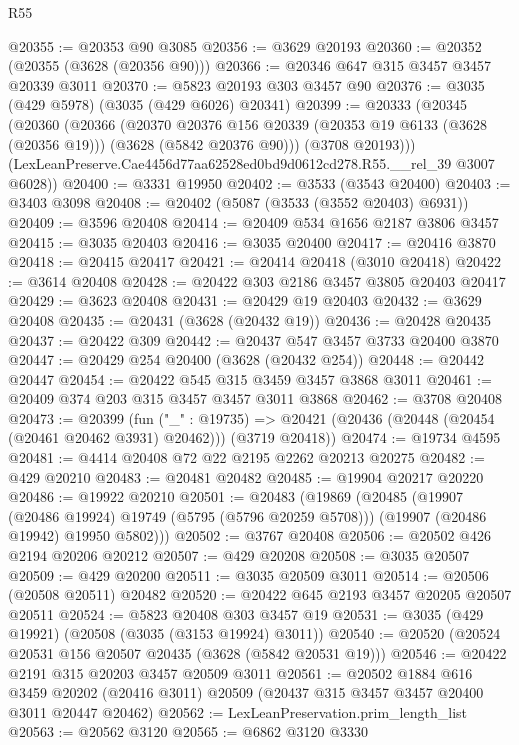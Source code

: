 \begin{lexlean}{R55}
\begin{coremodule}
@20355 := @20353 @90 @3085
@20356 := @3629 @20193
@20360 := @20352 (@20355 (@3628 (@20356 @90)))
@20366 := @20346 @647 @315 @3457 @3457 @20339 @3011
@20370 := @5823 @20193 @303 @3457 @90
@20376 := @3035 (@429 @5978) (@3035 (@429 @6026) @20341)
@20399 := @20333
    (@20345
      (@20360
        (@20366
          (@20370
            @20376
            @156
            @20339
            (@20353 @19 @6133 (@3628 (@20356 @19)))
            (@3628 (@5842 @20376 @90)))
          (@3708 @20193)))
      (LexLeanPreserve.Cae4456d77aa62528ed0bd9d0612cd278.R55.__rel_39 @3007 @6028))
@20400 := @3331 @19950
@20402 := @3533 (@3543 @20400)
@20403 := @3403 @3098
@20408 := @20402 (@5087 (@3533 (@3552 @20403) @6931))
@20409 := @3596 @20408
@20414 := @20409 @534 @1656 @2187 @3806 @3457
@20415 := @3035 @20403
@20416 := @3035 @20400
@20417 := @20416 @3870
@20418 := @20415 @20417
@20421 := @20414 @20418 (@3010 @20418)
@20422 := @3614 @20408
@20428 := @20422 @303 @2186 @3457 @3805 @20403 @20417
@20429 := @3623 @20408
@20431 := @20429 @19 @20403
@20432 := @3629 @20408
@20435 := @20431 (@3628 (@20432 @19))
@20436 := @20428 @20435
@20437 := @20422 @309
@20442 := @20437 @547 @3457 @3733 @20400 @3870
@20447 := @20429 @254 @20400 (@3628 (@20432 @254))
@20448 := @20442 @20447
@20454 := @20422 @545 @315 @3459 @3457 @3868 @3011
@20461 := @20409 @374 @203 @315 @3457 @3457 @3011 @3868
@20462 := @3708 @20408
@20473 := @20399
    (fun ("_" : @19735) =>
    @20421 (@20436 (@20448 (@20454 (@20461 @20462 @3931) @20462))) (@3719 @20418))
@20474 := @19734 @4595
@20481 := @4414 @20408 @72 @22 @2195 @2262 @20213 @20275
@20482 := @429 @20210
@20483 := @20481 @20482
@20485 := @19904 @20217 @20220
@20486 := @19922 @20210
@20501 := @20483
    (@19869
      (@20485
        (@19907 (@20486 @19924) @19749 (@5795 (@5796 @20259 @5708)))
        (@19907 (@20486 @19942) @19950 @5802)))
@20502 := @3767 @20408
@20506 := @20502 @426 @2194 @20206 @20212
@20507 := @429 @20208
@20508 := @3035 @20507
@20509 := @429 @20200
@20511 := @3035 @20509 @3011
@20514 := @20506 (@20508 @20511) @20482
@20520 := @20422 @645 @2193 @3457 @20205 @20507 @20511
@20524 := @5823 @20408 @303 @3457 @19
@20531 := @3035 (@429 @19921) (@20508 (@3035 (@3153 @19924) @3011))
@20540 := @20520 (@20524 @20531 @156 @20507 @20435 (@3628 (@5842 @20531 @19)))
@20546 := @20422 @2191 @315 @20203 @3457 @20509 @3011
@20561 := @20502
    @1884
    @616
    @3459
    @20202
    (@20416 @3011)
    @20509
    (@20437 @315 @3457 @3457 @20400 @3011 @20447 @20462)
@20562 := LexLeanPreservation.prim_length_list
@20563 := @20562 @3120
@20565 := @6862 @3120 @3330

\end{coremodule}
\end{lexlean}
